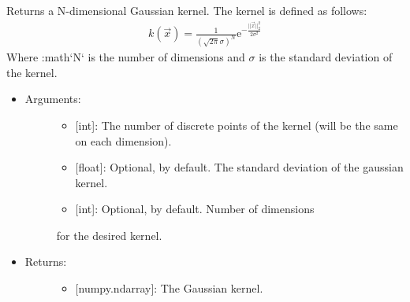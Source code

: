 \documentclass[letterpaper,10pt,english]{sphinxmanual}
\begin{document}

\begin{fulllineitems}
\label{\detokenize{signal:data_tools.signal.gauss_kernel}}
Returns a N-dimensional Gaussian kernel. The kernel is defined as
follows:
\begin{equation*}
\begin{split}k(\vec{x})=\frac{1}{(\sqrt{2\pi}\sigma)^N}\mathrm{e}^{-
\frac{||\vec{x}||_2^2}{2\sigma^2}}\end{split}
\end{equation*}
Where :math{}`N{}` is the number of dimensions and \(\sigma\) is
the standard deviation of the kernel.
\begin{itemize}
\item {} \begin{description}
\item[{Arguments:}] \leavevmode\begin{itemize}
\item {} 
 {[}int{]}: The number of discrete points of the kernel
(will be the same on each dimension).

\item {} 
 {[}float{]}: Optional,  by default. The standard
deviation of the gaussian kernel.

\item {} 
 {[}int{]}: Optional,  by default. Number of dimensions

\end{itemize}

for the desired kernel.

\end{description}

\item {} \begin{description}
\item[{Returns:}] \leavevmode\begin{itemize}
\item {} 
{[}numpy.ndarray{]}: The Gaussian kernel.

\end{itemize}

\end{description}

\end{itemize}

\end{fulllineitems}
\end{document}
